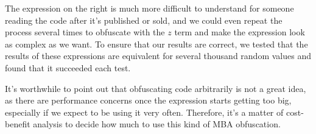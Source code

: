 The expression on the right is much more difficult to understand for someone
reading the code after it's published or sold, and we could even repeat the process
several times to obfuscate with the $z$ term and make the expression look as complex
as we want. To ensure that our results are correct, we tested that the results of
these expressions are equivalent for several thousand random values and found that
it succeeded each test.
\par It's worthwhile to point out that obfuscating code arbitrarily is not a great idea,
as there are performance concerns once the expression starts getting too big, especially
if we expect to be using it very often. Therefore, it's a matter of cost-benefit
analysis to decide how much to use this kind of MBA obfuscation.
